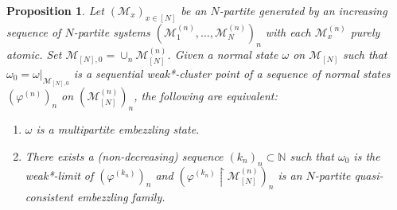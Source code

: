 \documentclass[a4paper, 10pt, onecolumn, accepted=2025-07-22]{quantumarticle}
\newtheorem{proposition}[theorem]{Proposition}
\theoremstyle{definition}
\newcommand{\mc}{\mathcal}
\newcommand{\up}[1]{^{(#1)}}
\def\M{{\mc M}}
\def\NN{{\mathbb N}}
\newcommand*{\1}{\text{\usefont{U}{bbold}{m}{n}1}}
\begin{document}
\begin{proposition}\label{prop:mbzfam_quasi}
    Let $(\M_x)_{x\in[N]}$ be an $N$-partite generated by an increasing sequence of $N$-partite systems $(\M\up{n}_1,\ldots,\M\up{n}_N)_n$ with each $\M\up{n}_x$ purely atomic.
    Set $\M_{[N],0} = \cup_n \M^{(n)}_{[N]}$.
    Given a normal state $\omega$ on $\M_{[N]}$ such that $\omega_{0} = \omega|_{\M_{[N],0}}$ is a sequential weak*-cluster point of a sequence of normal states $(\varphi^{(n)})_{n}$ on $(\M^{(n)}_{[N]})_{n}$, the following are equivalent:
    \begin{enumerate}
        \item \label{it:mbzfam_quasi_1} $\omega$ is a multipartite embezzling state.
        \item \label{it:mbzfam_quasi_2} There exists  a (non-decreasing) sequence $(k_{n})_{n}\subset\NN$ such that $\omega_{0}$ is the weak*-limit of $(\varphi^{(k_{n})})_{n}$ and $(\varphi^{(k_{n})}\restriction \M^{(n)}_{[N]})_{n}$ is an $N$-partite quasi-consistent embezzling family.
    \end{enumerate}
\end{proposition}
\end{document}
